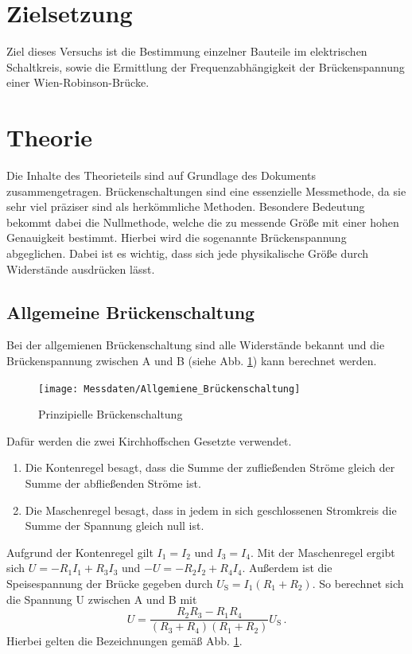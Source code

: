     \section{Zielsetzung}
    Ziel dieses Versuchs ist die Bestimmung einzelner Bauteile im elektrischen Schaltkreis,
    sowie die Ermittlung der Frequenzabhängigkeit der Brückenspannung einer Wien-Robinson-Brücke.

    \section{Theorie}
    \label{sec:Theorie}
    Die Inhalte des Theorieteils sind auf Grundlage des Dokuments \cite{V302_Anleitung} zusammengetragen.
    Brückenschaltungen sind eine essenzielle Messmethode, da sie sehr viel präziser sind als herkömmliche Methoden.
    Besondere Bedeutung bekommt dabei die Nullmethode, welche die zu messende Größe mit einer hohen Genauigkeit bestimmt.
    Hierbei wird die sogenannte Brückenspannung abgeglichen.
    Dabei ist es wichtig, dass sich jede physikalische Größe durch Widerstände ausdrücken lässt.
    \subsection{Allgemeine Brückenschaltung}
    Bei der allgemienen Brückenschaltung sind alle Widerstände bekannt und die Brückenspannung zwischen A und B (siehe
    Abb. \ref{fig:All_Brueckenschaltung}) kann berechnet werden.
    \begin{figure}
        \centering
        \texttt{[image: Messdaten/Allgemiene\_Brückenschaltung]}
        \caption{Prinzipielle Brückenschaltung}
        \label{fig:All_Brueckenschaltung}
    \end{figure}
    Dafür werden die zwei Kirchhoffschen Gesetzte verwendet.
    \begin{enumerate}
        \item Die Kontenregel besagt, dass die Summe der zufließenden Ströme gleich der Summe der abfließenden Ströme ist.
        \item Die Maschenregel besagt, dass in jedem in sich geschlossenen Stromkreis die Summe der Spannung gleich null ist.
    \end{enumerate}
    Aufgrund der Kontenregel gilt $I_1 = I_2$ und $I_3 = I_4$.
    Mit der Maschenregel ergibt sich $U = -R_1 I_1 + R_3 I_3$ und $-U = -R_2 I_2 + R_4 I_4$.
    Außerdem ist die Speisespannung der Brücke gegeben durch $U_\text{S} = I_1(R_1 + R_2)$.
    So berechnet sich die Spannung U zwischen A und B mit
    \begin{equation}
        U = \frac{R_2 R_3 - R_1 R_4}{(R_3 + R_4)(R_1 + R_2)}U_{\text{S}} \, \text{.}
        \label{eq:Brueckenspannung}
    \end{equation}
    Hierbei gelten die Bezeichnungen gemäß Abb. \ref{fig:All_Brueckenschaltung}.
